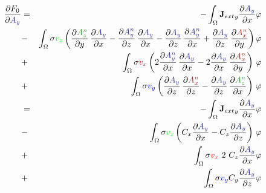 \documentclass[smallextended]{svjour3}       %
\begin{document}
			\begin{eqnarray}
			\frac{\partial F_0}{\partial \textcolor{darkblu}{A_y}} & = &
			-\int_{\Omega} {\mathbf{J}_{ext}}_y \frac{\partial \textcolor{darkblu}{A_y}}{\partial x} \varphi
			\nonumber \\
			& - & \int_{\Omega} \sigma \textcolor{gre}{v_z} \left(\frac{\partial \textcolor{darkgre}{A_z^n}}{\partial y}\,\frac{\partial \textcolor{darkblu}{A_y}}{\partial x} - \frac{\partial \textcolor{darkblu}{A_y^n}}{\partial z}\,\frac{\partial \textcolor{darkblu}{A_y}}{\partial x} - \frac{\partial \textcolor{darkblu}{A_y}}{\partial z}\,\frac{\partial \textcolor{darkblu}{A_y^n}}{\partial x} + \frac{\partial \textcolor{darkblu}{A_y}}{\partial z}\,\frac{\partial \textcolor{darkred}{A_x^n}}{\partial y} \right) \varphi \nonumber \\			
			& + &\int_{\Omega} \sigma \textcolor{red}{v_x} \left(2 \frac{\partial \textcolor{darkblu}{A_y^n}}{\partial x}\,\frac{\partial \textcolor{darkblu}{A_y}}{\partial x} - 2 \frac{\partial \textcolor{darkblu}{A_y}}{\partial x}\,\frac{\partial \textcolor{darkred}{A_x^n}}{\partial y}\right)\, \varphi \nonumber \\		
			& + & \int_{\Omega} \sigma \textcolor{blu}{v_y} \left(\frac{\partial \textcolor{darkblu}{A_y}}{\partial z}\,\frac{\partial \textcolor{darkred}{A_x^n}}{\partial z} - \frac{\partial \textcolor{darkblu}{A_y}}{\partial z}\,\frac{\partial \textcolor{darkgre}{A_z^n}}{\partial x} \right)\, \varphi\\
			 & = &
			-\int_{\Omega} {\mathbf{J}_{ext}}_y \frac{\partial \textcolor{darkblu}{A_y}}{\partial x} \varphi
			\nonumber \\
			& - &\int_{\Omega} \sigma  \textcolor{gre}{v_z} \left( C_x \frac{\partial \textcolor{darkblu}{A_y}}{\partial x} - C_z \frac{\partial \textcolor{darkblu}{A_y}}{\partial z}\right)\, \varphi \nonumber \\			
			& + & \int_{\Omega} \sigma \textcolor{red}{v_x}\ 2\ C_z \frac{\partial \textcolor{darkblu}{A_y}}{\partial x} \varphi \nonumber \\
			& + & \int_{\Omega} \sigma \textcolor{blu}{v_y}    C_y \frac{\partial \textcolor{darkblu}{A_y}}{\partial z} \varphi
					\end{eqnarray}
					
\end{document}
